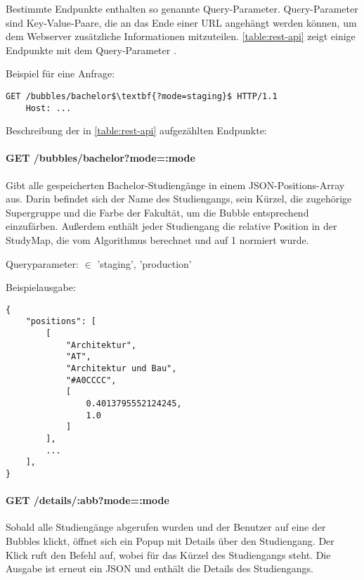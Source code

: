 Bestimmte Endpunkte enthalten so genannte Query-Parameter. Query-Parameter sind Key-Value-Paare, die an das Ende einer URL angehängt werden können, um dem Webserver zusätzliche Informationen mitzuteilen. \parencite{branch_query_2024} \autoref{table:rest-api} zeigt einige Endpunkte mit dem Query-Parameter .


\noindent
\begin{minipage}{\linewidth}
Beispiel für eine Anfrage:
\begin{lstlisting}[style=Python, mathescape=true]
    GET /bubbles/bachelor$\textbf{?mode=staging}$ HTTP/1.1
    Host: ...
\end{lstlisting}
\end{minipage}

\noindent
Beschreibung der in \autoref{table:rest-api} aufgezählten Endpunkte:

\paragraph*{GET /bubbles/bachelor?mode=:mode}
\vspace{-1.0em}
Gibt alle gespeicherten Bachelor-Studiengänge in einem JSON-Positions-Array aus. Darin befindet sich der Name des Studiengangs, sein Kürzel, die zugehörige Supergruppe und die Farbe der Fakultät, um die Bubble entsprechend einzufärben. Außerdem enthält jeder Studiengang die relative Position in der StudyMap, die vom Algorithmus berechnet und auf 1 normiert wurde.

\noindent
Queryparameter:  $\in$ {'staging', 'production'}

\noindent
\begin{minipage}{\linewidth}
Beispielausgabe:
\begin{lstlisting}[style=Python]
{
    "positions": [
        [
            "Architektur",
            "AT",
            "Architektur und Bau",
            "#A0CCCC",
            [
                0.4013795552124245,
                1.0
            ]
        ],
        ...
    ],
}
\end{lstlisting}
\end{minipage}

\paragraph*{GET /details/:abb?mode=:mode}
\vspace{-1.0em}
Sobald alle Studiengänge abgerufen wurden und der Benutzer auf eine der Bubbles klickt, öffnet sich ein Popup mit Details über den Studiengang. Der Klick ruft den Befehl  auf, wobei  für das Kürzel des Studiengangs steht. Die Ausgabe ist erneut ein JSON und enthält die Details des Studiengangs.

